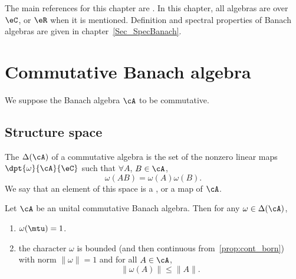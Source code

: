 
The main references for this chapter are \cite{Dixmier,Landsman}. In this chapter, all algebras are over $\eC$, or $\eR$ when it is mentioned. Definition and spectral properties of Banach algebras are given in chapter~\ref{Sec_SpecBanach}.

\section{Commutative Banach algebra}

We suppose the Banach algebra $\cA$ to be commutative.

\subsection{Structure space}

\begin{definition}      \label{DefStructureSpaceDel}
	The  $\Delta(\cA)$ of a commutative algebra is the set of the nonzero linear maps $\dpt{\omega}{\cA}{\eC}$ such that $\forall A$, $B\in\cA$,
	\[
		\omega(AB)=\omega(A)\omega(B).
	\]
	We say that an element of this space is a , or a  map of $\cA$.
\end{definition}

\begin{proposition}
	Let $\cA$ be an unital commutative Banach algebra. Then for any $\omega\in\Delta(\cA)$,
	\begin{enumerate}

		\item $\omega(\mtu)=1$.
		\item the character $\omega$ is bounded (and then continuous from~\ref{prop:cont_born}) with norm $\|\omega\|=1$ and for all $A\in\cA$,
		      \begin{equation} \label{eq:omAleqnA}
			      \|\omega(A)\|\leq \|A\|.
		      \end{equation}
	\end{enumerate}
\end{proposition}


